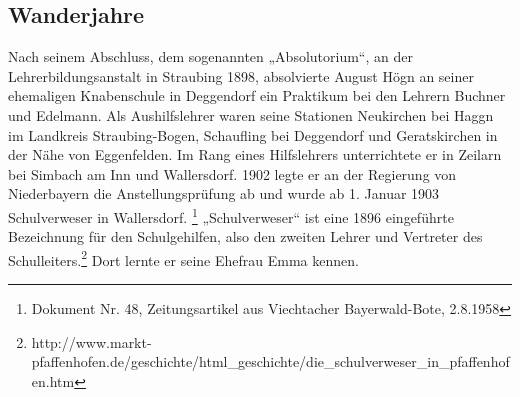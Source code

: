 \documentclass[a4paper]{article}
\begin{document}
\subsection{Wanderjahre}
\hypertarget{RefHeadingToc100333728}{}Nach seinem Abschluss, dem
sogenannten „Absolutorium“, an der Lehrerbildungsanstalt in Straubing
1898, absolvierte August Högn an seiner ehemaligen Knabenschule in
Deggendorf ein Praktikum bei den Lehrern Buchner und Edelmann. Als
Aushilfslehrer waren seine Stationen Neukirchen bei Haggn im Landkreis
Straubing-Bogen, Schaufling bei Deggendorf und Geratskirchen in der
Nähe von Eggenfelden. Im Rang eines Hilfslehrers unterrichtete er in
Zeilarn bei Simbach am Inn und Wallersdorf. 1902 legte er an der
Regierung von Niederbayern die Anstellungsprüfung ab und wurde ab 1.
Januar 1903 Schulverweser in Wallersdorf. \footnote{Dokument Nr. 48,
Zeitungsartikel aus Viechtacher Bayerwald-Bote, 2.8.1958}
„Schulverweser“ ist eine 1896 eingeführte Bezeichnung für den
Schulgehilfen, also den zweiten Lehrer und Vertreter des
Schulleiters.\footnote{
http://www.markt-pfaffenhofen.de/geschichte/html\_geschichte/die\_schulverweser\_in\_pfaffenhofen.htm}
Dort lernte er seine Ehefrau Emma kennen.
\end{document}
